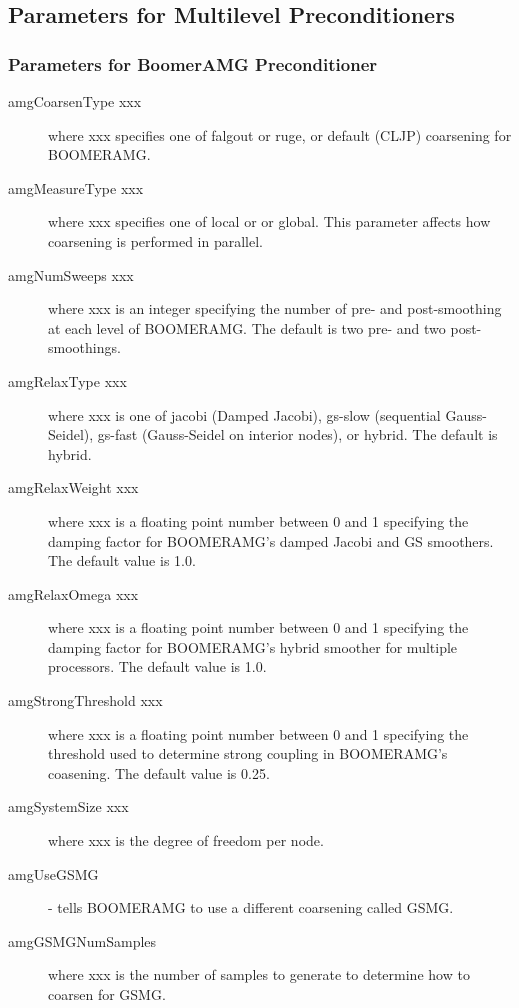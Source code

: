 \subsection{Parameters for Multilevel Preconditioners}

\subsubsection{Parameters for BoomerAMG Preconditioner}
\begin{description}
\item[amgCoarsenType xxx] where xxx specifies one of {\sf falgout} or
           {\sf ruge}, or {\sf default (CLJP)} coarsening for BOOMERAMG.
\item[amgMeasureType xxx] where xxx specifies one of {\sf local} or
           or {\sf global}.  This parameter affects how coarsening is performed
           in parallel.
\item[amgNumSweeps xxx] where xxx is an integer specifying the number of
           pre- and post-smoothing at each level of BOOMERAMG.
           The default is two pre- and two post-smoothings.
\item[amgRelaxType xxx] where xxx is one of {\sf jacobi} (Damped Jacobi),
           {\sf gs-slow} (sequential Gauss-Seidel), {\sf gs-fast}
           (Gauss-Seidel on interior nodes), or {\sf hybrid}.
           The default is {\sf hybrid}.
\item[amgRelaxWeight xxx] where xxx is a floating point number between 
           0 and 1 specifying the damping factor for BOOMERAMG's damped
           Jacobi and GS smoothers.  The default value is 1.0.
\item[amgRelaxOmega xxx] where xxx is a floating point number between 
           0 and 1 specifying the damping factor for BOOMERAMG's hybrid
           smoother for multiple processors.  The default value is 1.0.
\item[amgStrongThreshold xxx] where xxx is a floating point number between 0 
           and 1 specifying the threshold used to determine
           strong coupling in BOOMERAMG's coasening.  The default 
           value is 0.25.
\item[amgSystemSize xxx] where xxx is the degree of freedom per node.
\item[amgUseGSMG] - tells BOOMERAMG to use a different coarsening called GSMG.
\item[amgGSMGNumSamples] where xxx is the number of samples to generate
           to determine how to coarsen for GSMG.
\end{description}

